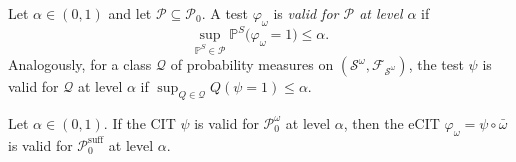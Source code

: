 \documentclass[twoside,11pt]{article}
\begin{document}
\begin{definition}[Validity]\label{def:validity}
Let $\alpha\in(0,1)$ and let $\mathcal{P}\subseteq\mathcal{P}_0$. A test $\varphi_\omega$ is
\emph{valid for $\mathcal{P}$ at level $\alpha$} if
\[
  \sup_{\mathbb{P}^S\in\mathcal{P}}\mathbb{P}^S\bigl(\varphi_\omega=1\bigr)\le\alpha .
\]
Analogously, for a class $\mathcal Q$ of probability measures on $(\mathcal S^\omega,\mathcal F_{\mathcal S^\omega})$, the test $\psi$ is valid for $\mathcal Q$ at level $\alpha$ if $\sup_{Q\in\mathcal Q}Q(\psi=1)\le\alpha$.
\end{definition}

\begin{theoremE}\label{thm:ecit-valid}
Let $\alpha\in(0,1)$. If the CIT $\psi$ is valid for $\mathcal{P}_0^{\omega}$ at
level $\alpha$, then the eCIT $\varphi_{\omega}=\psi\circ\bar\omega$ is valid for
$\mathcal{P}_0^{\mathrm{suff}}$ at level $\alpha$.
\end{theoremE}
\end{document}
